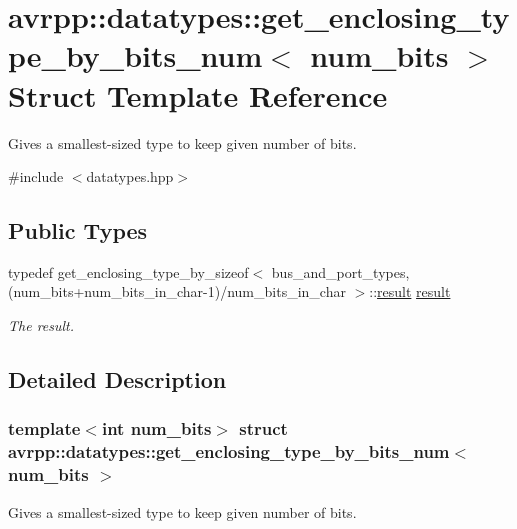 \hypertarget{structavrpp_1_1datatypes_1_1get__enclosing__type__by__bits__num}{
\section{avrpp::datatypes::get\_\-enclosing\_\-type\_\-by\_\-bits\_\-num$<$ num\_\-bits $>$ Struct Template Reference}
\label{structavrpp_1_1datatypes_1_1get__enclosing__type__by__bits__num}
}


Gives a smallest-\/sized type to keep given number of bits.  




{\ttfamily \#include $<$datatypes.hpp$>$}

\subsection*{Public Types}
\begin{DoxyCompactItemize}
\item 
typedef get\_\-enclosing\_\-type\_\-by\_\-sizeof$<$ bus\_\-and\_\-port\_\-types,(num\_\-bits+num\_\-bits\_\-in\_\-char-\/1)/num\_\-bits\_\-in\_\-char $>$::\hyperlink{structavrpp_1_1datatypes_1_1get__enclosing__type__by__bits__num_a5a646386afc0a101ca378ab8fdd3cd79}{result} \hyperlink{structavrpp_1_1datatypes_1_1get__enclosing__type__by__bits__num_a5a646386afc0a101ca378ab8fdd3cd79}{result}
\begin{DoxyCompactList}\small\item\em The result. \item\end{DoxyCompactList}\end{DoxyCompactItemize}


\subsection{Detailed Description}
\subsubsection*{template$<$int num\_\-bits$>$ struct avrpp::datatypes::get\_\-enclosing\_\-type\_\-by\_\-bits\_\-num$<$ num\_\-bits $>$}

Gives a smallest-\/sized type to keep given number of bits. 

